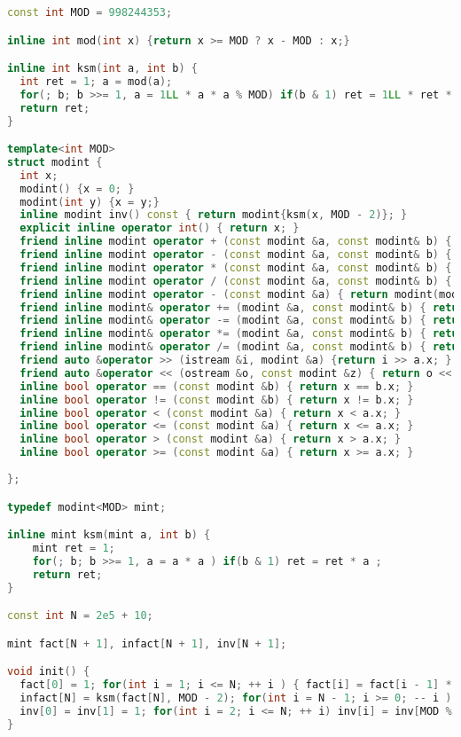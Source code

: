 \begin{lstlisting}[language=C++]
const int MOD = 998244353;

inline int mod(int x) {return x >= MOD ? x - MOD : x;}

inline int ksm(int a, int b) {
  int ret = 1; a = mod(a);
  for(; b; b >>= 1, a = 1LL * a * a % MOD) if(b & 1) ret = 1LL * ret * a % MOD;
  return ret;
}

template<int MOD> 
struct modint {
  int x;
  modint() {x = 0; }
  modint(int y) {x = y;}
  inline modint inv() const { return modint{ksm(x, MOD - 2)}; }
  explicit inline operator int() { return x; }
  friend inline modint operator + (const modint &a, const modint& b) { return modint(mod(a.x + b.x)); }
  friend inline modint operator - (const modint &a, const modint& b) { return modint(mod(a.x - b.x + MOD)); }
  friend inline modint operator * (const modint &a, const modint& b) { return modint(1ll * a.x * b.x % MOD); }
  friend inline modint operator / (const modint &a, const modint& b) { return modint(1ll * a.x * b.inv().x % MOD); }
  friend inline modint operator - (const modint &a) { return modint(mod(MOD - a.x)); }
  friend inline modint& operator += (modint &a, const modint& b) { return a = a + b; }
  friend inline modint& operator -= (modint &a, const modint& b) { return a = a - b; }
  friend inline modint& operator *= (modint &a, const modint& b) { return a = a * b; }
  friend inline modint& operator /= (modint &a, const modint& b) { return a = a / b; }
  friend auto &operator >> (istream &i, modint &a) {return i >> a.x; }
  friend auto &operator << (ostream &o, const modint &z) { return o << z.x; }
  inline bool operator == (const modint &b) { return x == b.x; }
  inline bool operator != (const modint &b) { return x != b.x; }
  inline bool operator < (const modint &a) { return x < a.x; }
  inline bool operator <= (const modint &a) { return x <= a.x; }
  inline bool operator > (const modint &a) { return x > a.x; }
  inline bool operator >= (const modint &a) { return x >= a.x; }
  
};

typedef modint<MOD> mint;

inline mint ksm(mint a, int b) {
	mint ret = 1; 
	for(; b; b >>= 1, a = a * a ) if(b & 1) ret = ret * a ;
	return ret;
}

const int N = 2e5 + 10;

mint fact[N + 1], infact[N + 1], inv[N + 1];

void init() {
  fact[0] = 1; for(int i = 1; i <= N; ++ i ) { fact[i] = fact[i - 1] * i; }
  infact[N] = ksm(fact[N], MOD - 2); for(int i = N - 1; i >= 0; -- i ) infact[i] = infact[i + 1] * (i + 1);
  inv[0] = inv[1] = 1; for(int i = 2; i <= N; ++ i) inv[i] = inv[MOD % i] * (MOD - MOD / i);
}

\end{lstlisting}
